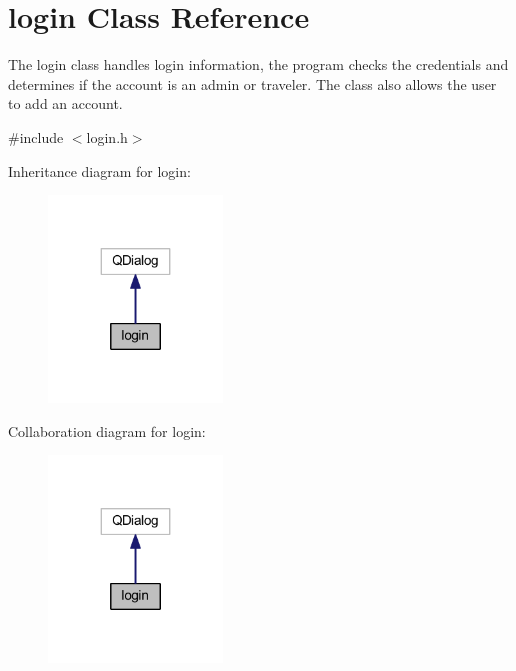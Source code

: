 \hypertarget{classlogin}{}\section{login Class Reference}
\label{classlogin}


The login class handles login information, the program checks the credentials and determines if the account is an admin or traveler. The class also allows the user to add an account.  




{\ttfamily \#include $<$login.\+h$>$}



Inheritance diagram for login\+:
\nopagebreak
\begin{figure}[H]
\begin{center}
\leavevmode
\includegraphics[width=131pt]{classlogin__inherit__graph}
\end{center}
\end{figure}


Collaboration diagram for login\+:
\nopagebreak
\begin{figure}[H]
\begin{center}
\leavevmode
\includegraphics[width=131pt]{classlogin__coll__graph}
\end{center}
\end{figure}
